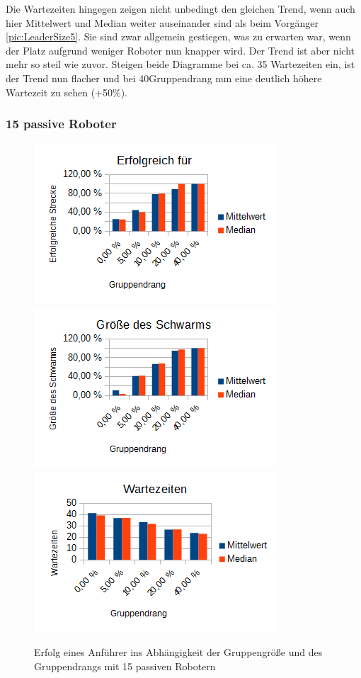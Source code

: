 Die Wartezeiten hingegen zeigen nicht unbedingt den gleichen Trend, wenn auch hier Mittelwert und Median weiter auseinander sind als beim Vorgänger \autoref{pic:LeaderSize5}. Sie sind zwar allgemein gestiegen, was zu erwarten war, wenn der Platz aufgrund weniger Roboter nun knapper wird. Der Trend ist aber nicht mehr so steil wie zuvor. Steigen beide Diagramme bei ca. 35 Wartezeiten ein, ist der Trend nun flacher und bei 40\per Gruppendrang nun eine deutlich höhere Wartezeit zu sehen (+50\%).

\subsubsection*{15 passive Roboter}

\begin{figure}[h]
	\includegraphics[width=\sectionLeaderPictureWidth , height=\sectionLeaderPictureHeight]{graphics/Statistics/Leader/FlockSize/15_1.png}
	\includegraphics[width=\sectionLeaderPictureWidth , height=\sectionLeaderPictureHeight]{graphics/Statistics/Leader/FlockSize/15_2.png}
	\includegraphics[width=\sectionLeaderPictureWidth , height=\sectionLeaderPictureHeight]{graphics/Statistics/Leader/FlockSize/15_3.png}
	\caption{Erfolg eines Anführer ins Abhängigkeit der Gruppengröße und des Gruppendrangs mit 15 passiven Robotern}
	\label{pic:LeaderSize15}
\end{figure}

